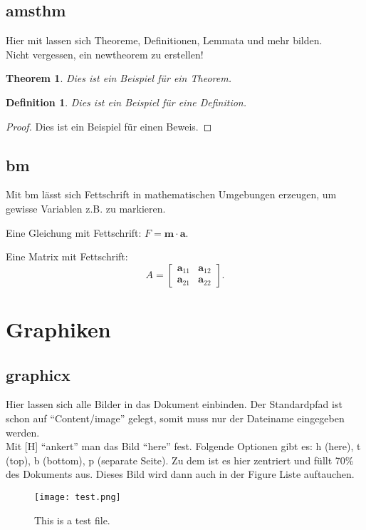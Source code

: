 \subsection{amsthm}

Hier mit lassen sich Theoreme, Definitionen, Lemmata und mehr bilden. \\
Nicht vergessen, ein newtheorem zu erstellen! \\

\newtheorem{theorem}{Theorem}

\newtheorem{definition}{Definition}

\begin{theorem}
    Dies ist ein Beispiel für ein Theorem.
\end{theorem}

\begin{definition}
    Dies ist ein Beispiel für eine Definition.
\end{definition}

\begin{proof}
    Dies ist ein Beispiel für einen Beweis.
\end{proof}

\subsection{bm}
Mit bm lässt sich Fettschrift in mathematischen Umgebungen erzeugen, um gewisse Variablen z.B. zu markieren.

Eine Gleichung mit Fettschrift: $F = \bm{m \cdot a}$.

Eine Matrix mit Fettschrift:
\[
{A} = 
\begin{bmatrix}
    \bm{a}_{11} & \bm{a}_{12} \\
    \bm{a}_{21} & \bm{a}_{22}
\end{bmatrix}.
\]


\section{Graphiken}
\subsection{graphicx}
Hier lassen sich alle Bilder in das Dokument einbinden. Der Standardpfad ist schon auf \enquote{Content/image} gelegt, somit muss nur der Dateiname eingegeben werden. \\

Mit [H] \enquote{ankert} man das Bild \enquote{here} fest. Folgende Optionen gibt es: h (here), t (top), b (bottom), p (separate Seite). Zu dem ist es hier zentriert und füllt 70\% des Dokuments aus. Dieses Bild wird dann auch in der Figure Liste auftauchen. \\
\begin{figure}[H]
    \centering
    \texttt{[image: test.png]}
    \caption{This is a test file.}\label{Figure:Testfile}
  \end{figure}

